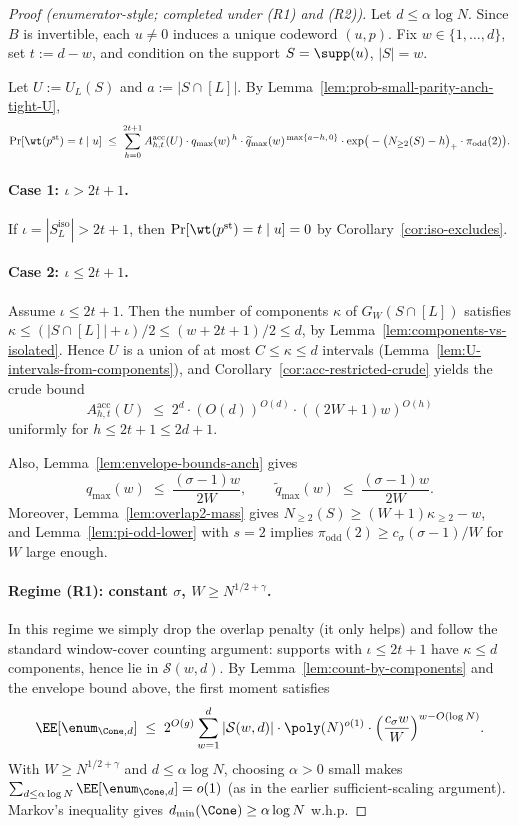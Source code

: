 \begin{proof}[Proof (enumerator-style; completed under (R1) and (R2))]
Let $d\le \alpha\log N$.
Since $B$ is invertible, each $u\neq 0$ induces a unique codeword $(u,p)$.
Fix $w\in\{1,\dots,d\}$, set $t:=d-w$, and condition on the support $S=\supp(u)$, $|S|=w$.

Let $U:=U_L(S)$ and $a:=|S\cap[L]|$.
By Lemma~\ref{lem:prob-small-parity-anch-tight-U},
\[
\Pr[\wt(p^{\mathrm{st}})=t\mid u]
\;\le\;
\sum_{h=0}^{2t+1}
A^{\mathrm{acc}}_{h,t}(U)\cdot
q_{\max}(w)^{\,h}\cdot
\widetilde q_{\max}(w)^{\,\max\{a-h,\,0\}}\cdot
\exp\!\big(-\big(N_{\ge 2}(S)-h\big)_+\cdot \pi_{\mathrm{odd}}(2)\big).
\]

\paragraph{Case 1: $\iota>2t+1$.}
If $\iota=|S_L^{\mathrm{iso}}|>2t+1$, then $\Pr[\wt(p^{\mathrm{st}})=t\mid u]=0$ by Corollary~\ref{cor:iso-excludes}.

\paragraph{Case 2: $\iota\le 2t+1$.}
Assume $\iota\le 2t+1$.
Then the number of components $\kappa$ of $G_W(S\cap[L])$ satisfies $\kappa\le (|S\cap[L]|+\iota)/2\le (w+2t+1)/2\le d$,
by Lemma~\ref{lem:components-vs-isolated}.
Hence $U$ is a union of at most $C\le \kappa\le d$ intervals (Lemma~\ref{lem:U-intervals-from-components}), and
Corollary~\ref{cor:acc-restricted-crude} yields the crude bound
\[
A^{\mathrm{acc}}_{h,t}(U) \;\le\; 2^{d}\cdot (O(d))^{O(d)}\cdot ((2W+1)w)^{O(h)}
\]
uniformly for $h\le 2t+1\le 2d+1$.

Also, Lemma~\ref{lem:envelope-bounds-anch} gives
\[
q_{\max}(w)\;\le\;\frac{(\sigma-1)w}{2W},
\qquad
\widetilde q_{\max}(w)\;\le\;\frac{(\sigma-1)w}{2W}.
\]
Moreover, Lemma~\ref{lem:overlap2-mass} gives $N_{\ge 2}(S)\ge (W+1)\kappa_{\ge 2}-w$, and Lemma~\ref{lem:pi-odd-lower}
with $s=2$ implies $\pi_{\mathrm{odd}}(2)\ge c_\sigma(\sigma-1)/W$ for $W$ large enough.

\paragraph{Regime (R1): constant $\sigma$, $W\ge N^{1/2+\gamma}$.}
In this regime we simply drop the overlap penalty (it only helps) and follow the standard window-cover counting argument:
supports with $\iota\le 2t+1$ have $\kappa\le d$ components, hence lie in $\mathcal S(w,d)$.
By Lemma~\ref{lem:count-by-components} and the envelope bound above, the first moment satisfies
\[
\EE[\enum_{\Cone,d}]
\;\le\;
2^{O(g)}\sum_{w=1}^{d}
|\mathcal S(w,d)|\cdot \poly(N)^{o(1)}\cdot \Big(\frac{c_\sigma w}{W}\Big)^{w-O(\log N)}.
\]
With $W\ge N^{1/2+\gamma}$ and $d\le \alpha\log N$, choosing $\alpha>0$ small makes
$\sum_{d\le \alpha\log N}\EE[\enum_{\Cone,d}]=o(1)$ (as in the earlier sufficient-scaling argument).
Markov's inequality gives $d_{\min}(\Cone)\ge \alpha\log N$ w.h.p.


\end{proof}
